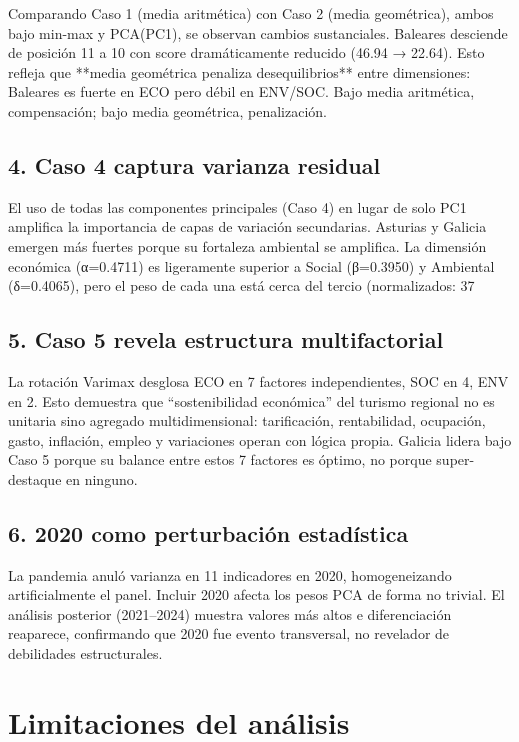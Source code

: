 Comparando Caso 1 (media aritmética) con Caso 2 (media geométrica), ambos bajo min-max y PCA(PC1), se observan cambios sustanciales. Baleares desciende de posición 11 a 10 con score dramáticamente reducido (46.94 → 22.64). Esto refleja que **media geométrica penaliza desequilibrios** entre dimensiones: Baleares es fuerte en ECO pero débil en ENV/SOC. Bajo media aritmética, compensación; bajo media geométrica, penalización.

\subsection{4. Caso 4 captura varianza residual}

El uso de todas las componentes principales (Caso 4) en lugar de solo PC1 amplifica la importancia de capas de variación secundarias. Asturias y Galicia emergen más fuertes porque su fortaleza ambiental se amplifica. La dimensión económica (α=0.4711) es ligeramente superior a Social (β=0.3950) y Ambiental (δ=0.4065), pero el peso de cada una está cerca del tercio (normalizados: 37%

\subsection{5. Caso 5 revela estructura multifactorial}

La rotación Varimax desglosa ECO en 7 factores independientes, SOC en 4, ENV en 2. Esto demuestra que ``sostenibilidad económica'' del turismo regional no es unitaria sino agregado multidimensional: tarificación, rentabilidad, ocupación, gasto, inflación, empleo y variaciones operan con lógica propia. Galicia lidera bajo Caso 5 porque su balance entre estos 7 factores es óptimo, no porque super-destaque en ninguno.

\subsection{6. 2020 como perturbación estadística}

La pandemia anuló varianza en 11 indicadores en 2020, homogeneizando artificialmente el panel. Incluir 2020 afecta los pesos PCA de forma no trivial. El análisis posterior (2021--2024) muestra valores más altos e diferenciación reaparece, confirmando que 2020 fue evento transversal, no revelador de debilidades estructurales.

\section{Limitaciones del análisis}

